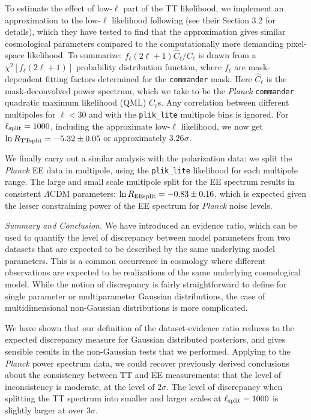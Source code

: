\documentclass[amsmath, prl, reprint, aps]{revtex4-1}
\begin{document}
    To estimate the effect of low-$\ell$ part of the TT likelihood, we implement an approximation to the low-$\ell$ likelihood following \cite{Aghanim:2016sns} (see their Section 3.2 for details), which they have tested to find that the approximation gives similar cosmological parameters compared to the computationally more demanding pixel-space likelihood. To summarize: $f_\ell(2\ell+1) \hat{C}_\ell/C_\ell$ is drawn from a $\chi^2[f_\ell(2\ell+1)]$ probability distribution function, where $f_\ell$ are mask-dependent fitting factors determined for the {\tt commander} mask. Here $\hat{C}_\ell$ is the mask-deconvolved power spectrum, which we take to be the {\it Planck} {\tt commander} quadratic maximum likelihood (QML) $C_\ell$s. Any correlation between different multipoles for $\ell<30$ and with the {\tt plik\_lite} multipole bins is ignored. For $\ell_{\rm split}=1000$, including the approximate low-$\ell$ likelihood, we now get $\ln R_{\rm TTsplit}=-5.32 \pm 0.05$ or approximately $3.26\sigma$. 
    
    {We finally carry out a similar analysis with the polarization data: we split the {\it Planck} EE data in multipole, using the {\tt plik\_lite} likelihood for each multipole range}. The large and small scale multipole split for the EE spectrum results in consistent $\Lambda$CDM parameters: $\ln R_{\rm EEsplit}=-0.83\pm 0.16$, which is expected given the lesser constraining power of the EE spectrum for {\it Planck} noise levels. 
    
    \medskip
    \textit{Summary and Conclusion.} \label{sec:summary}
    We have introduced an evidence ratio, which can be used to quantify the level of discrepancy between model parameters from two datasets that are expected to be described by the same underlying model parameters. This is a common occurrence in cosmology where different observations are expected to be realizations of the same underlying cosmological model. While the notion of discrepancy is fairly straightforward to define for single parameter or multiparameter Gaussian distributions, the case of multidimensional non-Gaussian distributions is more complicated. 
    
    We have shown that our definition of the dataset-evidence ratio reduces to the expected discrepancy measure for Gaussian distributed posteriors, and gives sensible results in the non-Gaussian tests that we performed. Applying to the {\it Planck} power spectrum data, we could recover previously derived conclusions about the consistency between TT and EE measurements: that the level of inconsistency is moderate, at the level of $2 \sigma$. The level of discrepancy when splitting the TT spectrum into smaller and larger scales at $\ell_{\rm split}=1000$ is slightly larger at over $3\sigma$.
    
\end{document}
